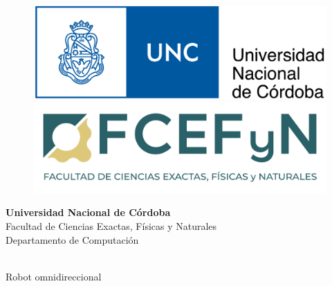 
\thispagestyle{empty}
\begin{center}
    \begin{figure} \begin{minipage}{.4\textwidth}
        \includegraphics[scale=0.13]{images/logo_unc.png}
    \end{minipage}
    \hfill
    \begin{minipage}{.5\textwidth}
        \vspace{0.45cm}
        \includegraphics[scale=0.27]{images/logo_FCEFyN.png}
    \end{minipage}\end{figure}
    
    \vspace{1cm}

    \begin{LARGE}
        \textbf{Universidad Nacional de Córdoba} \\
        \vspace{0.3cm}
        Facultad de Ciencias Exactas, Físicas y Naturales \\
        \vspace{0.3cm}
        Departamento de Computación \\
    \end{LARGE}
    
    \vspace{2cm}

    \begin{Huge}
        \textbf{\newtitle} \\
        \vspace{0.3cm}
        Robot omnidireccional \\
    \end{Huge}


\end{center}
